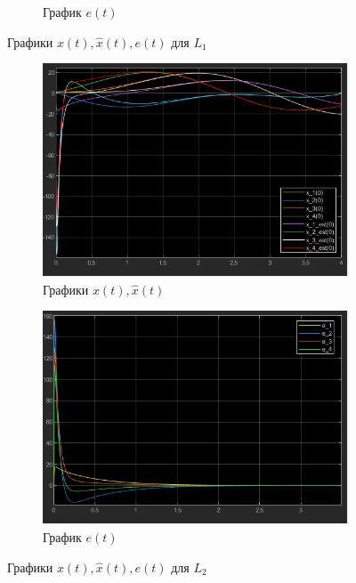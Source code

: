 \documentclass[a4paper, 12pt]{article}
\begin{document}
\begin{figure}[H]
\begin{subfigure}{0.45\textwidth}
            \caption{График $e(t)$}
            \label{fig:task_2_e_l1}
        \end{subfigure}
        \caption{Графики $x(t),\hat{x}(t),e(t)$ для $L_1$}
        \label{fig:task_2_modeling_1}
    \end{figure}
    \begin{figure}[H]
        \centering
        \begin{subfigure}{0.45\textwidth}
            \centering
            \includegraphics[width=\linewidth]{x_t_x_est_t_l2_task2.png}
            \caption{Графики $x(t),\hat{x}(t)$}
            \label{fig:task_2_x_t_l2}
        \end{subfigure}
        \hfill
        \begin{subfigure}{0.45\textwidth}
            \centering
            \includegraphics[width=\linewidth]{e_l2_task2.png}
            \caption{График $e(t)$}
            \label{fig:task_2_e_l2}
        \end{subfigure}
        \caption{Графики $x(t),\hat{x}(t),e(t)$ для $L_2$}
        \label{fig:task_2_modeling_2}
    \end{figure}
\end{document}
